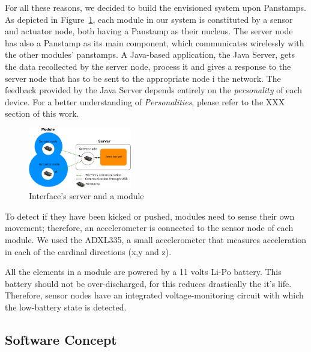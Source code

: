For all these reasons, we decided to build the envisioned system upon Panstamps. As depicted in Figure~\ref{fig:server-module}, each module in our system is constituted by a sensor and actuator node, both having a Panstamp as their nucleus. The server node has also a Panstamp as its main component, which communicates wirelessly with the other modules' panstamps. A Java-based application, the Java Server, gets the data recollected by the server node, process it and gives a response to the server node that has to be sent to the appropriate node i the network. The feedback provided by the Java Server depends entirely on the \emph{personality} of each device. For a better understanding of \emph{Personalities}, please refer to the XXX section of this work.

\begin{figure}[h!]
 \centering
 \includegraphics[width= 0.4\textwidth, clip=true  ,keepaspectratio=true]{./graph/entity_server.png}
 \caption{Interface's server and a module}
 \label{fig:server-module}
\end{figure}

To detect if they have been kicked or pushed, modules need to sense their own movement; therefore, an accelerometer is connected to the sensor node of each module. We used the ADXL335, a small accelerometer that measures acceleration in each of the cardinal directions (x,y and z).

All the elements in a module are powered by a 11 volts Li-Po battery. This battery should not be over-discharged, for this reduces drastically the it's life. Therefore, sensor nodes have an integrated voltage-monitoring circuit with which the low-battery state is detected.


\subsection{Software Concept} 

